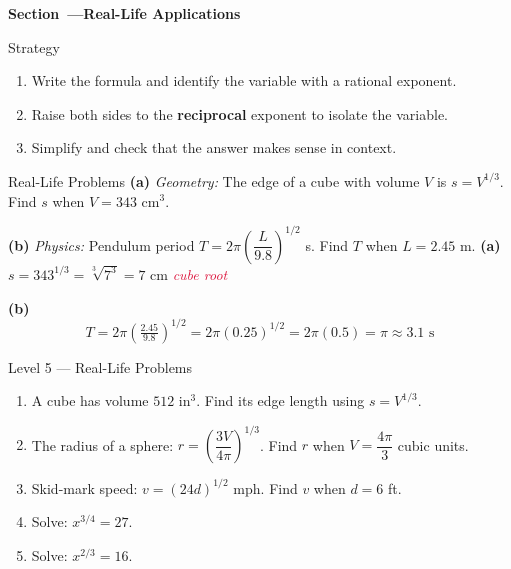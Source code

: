 \documentclass[12pt]{article}
\newcounter{mysec}
\newcommand{\mysection}[1]{%
  \stepcounter{mysec}%
  \vspace{14pt}%
  \noindent
  \begin{tcolorbox}[enhanced,colback=navy,colframe=navy,
    boxrule=0pt,arc=3pt,left=8pt,right=8pt,top=5pt,bottom=5pt,
    before skip=0pt,after skip=10pt]
    \color{white}\bfseries\large Section~\themysec\enspace---\enspace #1
  \end{tcolorbox}}
\newcommand{\step}[1]{\hfill\textcolor{crimson}{\small\textit{#1}}}
\begin{document}
\mysection{Real-Life Applications}

\begin{conceptbox}{Strategy}
\begin{enumerate}
  \item Write the formula and identify the variable with a rational exponent.
  \item Raise both sides to the \textbf{reciprocal} exponent to isolate the variable.
  \item Simplify and check that the answer makes sense in context.
\end{enumerate}
\end{conceptbox}

\begin{examplebox}{Real-Life Problems}
\textbf{(a)} \textit{Geometry:} The edge of a cube with volume $V$ is $s=V^{1/3}$.
Find $s$ when $V=343\text{ cm}^3$.

\medskip
\textbf{(b)} \textit{Physics:} Pendulum period $T=2\pi\!\left(\dfrac{L}{9.8}\right)^{1/2}$ s.
Find $T$ when $L=2.45$ m.
\tcblower
\textbf{(a)} $s=343^{1/3}=\sqrt[3]{7^3}=7\text{ cm}$ \step{cube root}

\medskip
\textbf{(b)}
\[
  T=2\pi\!\left(\tfrac{2.45}{9.8}\right)^{1/2}=2\pi(0.25)^{1/2}=2\pi(0.5)=\pi\approx3.1\text{ s}
\]
\end{examplebox}

\begin{practicebox}{Level 5 --- Real-Life Problems}
\begin{enumerate}[label=\textbf{\arabic*.},leftmargin=*,itemsep=12pt]
  \item A cube has volume $512\text{ in}^3$. Find its edge length using $s=V^{1/3}$.
  \item The radius of a sphere: $r=\left(\dfrac{3V}{4\pi}\right)^{1/3}$.
    Find $r$ when $V=\dfrac{4\pi}{3}$ cubic units.
  \item Skid-mark speed: $v=(24d)^{1/2}$ mph. Find $v$ when $d=6$ ft.
  \item Solve: $x^{3/4}=27$.
  \item Solve: $x^{2/3}=16$.
\end{enumerate}
\end{practicebox}

\newpage
\begin{tcolorbox}[enhanced,colback=navy,colframe=navy,arc=6pt,
  left=12pt,right=12pt,top=8pt,bottom=8pt]
  \centering\color{white}{\Large\bfseries Complete Solutions --- Chapter 8}
\end{tcolorbox}
\vspace{8pt}
\end{document}
